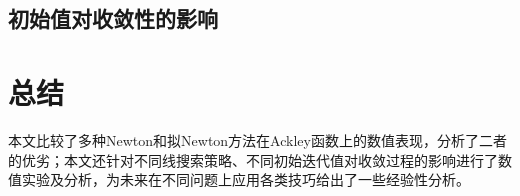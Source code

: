 \documentclass{article}
\begin{document}
\subsection{初始值对收敛性的影响}



\section{总结}
本文比较了多种Newton和拟Newton方法在Ackley函数上的数值表现，分析了二者的优劣；本文还针对不同线搜索策略、不同初始迭代值对收敛过程的影响进行了数值实验及分析，为未来在不同问题上应用各类技巧给出了一些经验性分析。


\end{document}
